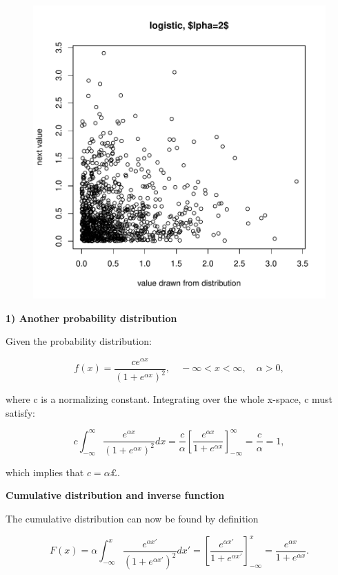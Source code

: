 \documentclass[12pt]{article}
\begin{document}
{{\begin{figure}[H]
\centering
\includegraphics{p1partC01v02-003}
\end{figure}

{\sffamily \textbf{1) Another probability distribution}

Given the probability distribution:

\begin{equation}
f(x) = \frac{ce^{\alpha x}}{(1+e^{\alpha x})^2}, \quad -\infty < x < \infty, \quad \alpha >  0,
\end{equation}

where c is a normalizing constant. Integrating over the whole x-space, c must satisfy:

\begin{equation}
c \int_{-\infty}^{\infty} \frac{e^{\alpha x}}{(1+e^{\alpha x})^2} dx = \frac{c}{\alpha} \left[\frac{e^{\alpha x}}{1 + e^{\alpha x}}\right]_{-\infty}^{\infty} = \frac{c}{\alpha} = 1,
\end{equation}

which implies that $c = \alpha£$.

{\sffamily \textbf{Cumulative distribution and inverse function}

The cumulative distribution can now be found by definition

\begin{equation}
F(x) =  \alpha \int_{-\infty}^{x} \frac{e^{\alpha x'}}{(1+e^{\alpha x'})^2} dx' = \left[\frac{e^{\alpha x'}}{1 + e^{\alpha x'}}\right]_{-\infty}^{x} = \frac{e^{\alpha x}}{1+e^{\alpha x}}.
\end{equation}

}}}}
\end{document}
